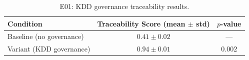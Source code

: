 \begin{table}[ht]
\centering
\caption{E01: KDD governance traceability results.}
\label{tab:e01-results}
\begin{tabular}{lcc}
\toprule
Condition & Traceability Score (mean $\pm$ std) & $p$-value \\
\midrule
Baseline (no governance) & $0.41 \pm 0.02$ & --- \\
Variant (KDD governance) & $0.94 \pm 0.01$ & $0.002$ \\
\bottomrule
\end{tabular}
\end{table}
